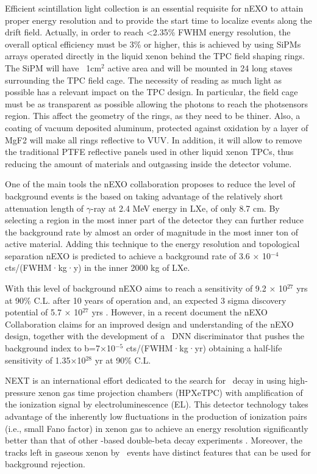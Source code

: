 Efficient scintillation light collection is an essential requisite for nEXO to attain proper energy resolution and to provide the start time to localize events along the drift field. Actually, in order to reach <2.35\% FWHM energy resolution, the overall optical efficiency must be 3\%  or higher, this is achieved by using SiPMs arrays operated directly in the liquid xenon behind the TPC field shaping rings. The SiPM will have ~1cm$^2$ active area and will be mounted in 24 long staves surrounding the TPC field cage. The necessity of reading as much light as possible has a relevant impact on the TPC design. In particular, the field cage must be as transparent as possible allowing the photons to reach the photsensors region. This affect the geometry of the rings, as they need to be thiner. Also, a coating of vacuum deposited aluminum, protected against oxidation by a layer of MgF2 will make all rings reflective to VUV. In addition, it will allow to remove the traditional PTFE reflective panels used in other liquid xenon TPCs, thus reducing the amount of materials and outgassing inside the detector volume.

One of the main tools the nEXO collaboration proposes to reduce the level of background events is the based on taking advantage of the relatively short attenuation length of $\gamma$-ray at 2.4 MeV energy in LXe, of only 8.7 cm. By selecting a region in the most inner part of the detector they can further reduce the background rate by almost an order of magnitude in the most inner ton of active material. Adding this technique to the energy resolution and topological separation nEXO is predicted to achieve a background rate of 3.6 × 10$^{-4}$ cts/(FWHM·kg·y) in the inner 2000 kg of LXe. 

With this level of background nEXO aims to reach a sensitivity of 9.2 × 10$^{27}$ yrs at 90\% C.L. after 10 years of operation and, an expected 3 sigma discovery potential of 5.7 × 
10$^{27}$ yrs \cite{nexocprecdr}. However, in a recent document \cite{nEXO:2021ujk} the nEXO Collaboration claims for an improved design and understanding of the nEXO design, together with the development of a \bbonu\ DNN discriminator that pushes the background index to 
b=7×10$^{-5}$ cts/(FWHM·kg·yr) obtaining a half-life sensitivity of 1.35×10$^{28}$ 
yr at 90\% C.L.

NEXT is an international effort dedicated to the search for \bbonu\ decay in  using high-pressure xenon gas time projection chambers (HPXeTPC) with amplification of the ionization signal by electroluminescence (EL). This detector technology takes advantage of the inherently low fluctuations in the production of ionization pairs (i.e., small Fano factor) in xenon gas to achieve an energy resolution significantly better than that of other -based double-beta decay experiments \cite{Nygren:2009zz}. Moreover, the tracks left in gaseous xenon by \bbonu\ events have distinct features that can be used for background rejection. 

